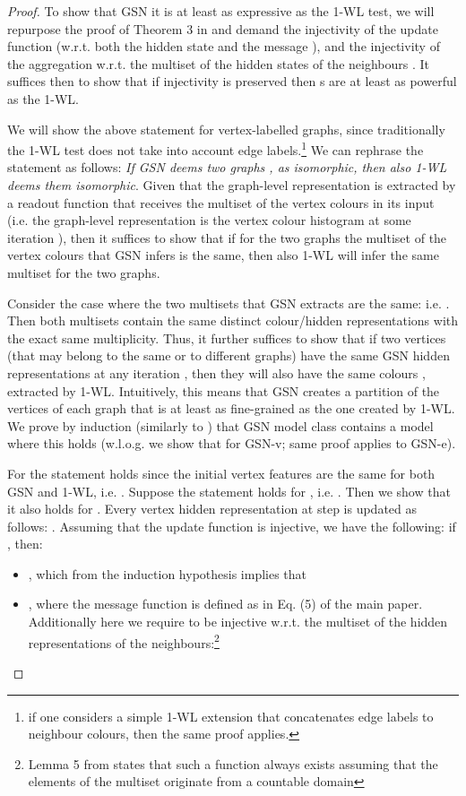 \begin{proof}

To show that GSN it is at least as expressive as the 1-WL test, we will repurpose the proof of Theorem 3 in \cite{xu2018how}  and demand the injectivity of the update function (w.r.t. both the hidden state  and the message ), and the injectivity of the aggregation w.r.t. the multiset of the hidden states of the neighbours . It suffices then to show that if injectivity is preserved then \modelname s are at least as powerful as the 1-WL.



We will show the above statement for vertex-labelled graphs, since traditionally the 1-WL test does not take into account edge labels.\footnote{if one considers a simple 1-WL extension that concatenates edge labels to neighbour colours, then the same proof applies.} We can rephrase the statement as follows: \textit{If GSN deems two graphs ,  as isomorphic, then also 1-WL deems them isomorphic}. Given that the graph-level representation is extracted by a readout function that receives the multiset of the vertex colours in its input (i.e. the graph-level representation is the vertex colour histogram at some iteration ), then it suffices to show that if for the two graphs the multiset of the vertex colours that GSN infers is the same, then also 1-WL will infer the same multiset for the two graphs. 

Consider the case where the two multisets that GSN extracts are the same:  i.e. . Then both multisets contain the same distinct colour/hidden representations with the exact same multiplicity. Thus, it further suffices to show that
if two vertices  (that may belong to the same or to different graphs) have the same GSN hidden representations  at any iteration , then they will also have the same colours , extracted by 1-WL. Intuitively, this means that GSN creates a partition of the vertices of each graph that is at least as fine-grained as the one created by 1-WL. We prove by induction (similarly to \cite{xu2018how}) that GSN model class contains a model where this holds (w.l.o.g. we show that for GSN-v; same proof applies to GSN-e).

For  the statement holds since the initial vertex features are the same for both GSN and 1-WL, i.e. . Suppose the statement holds for , i.e. . Then we show that it also holds for . Every vertex hidden representation at step  is updated as follows: . Assuming that the update function  is injective, we have the following: if , then:
\begin{itemize}[wide, labelwidth=!, labelindent=0pt]
\item , which from the induction hypothesis implies that  
\item , where the message function is defined as in Eq. (5) of the main paper.
Additionally here we require  to be injective w.r.t. the multiset of the hidden representations of the neighbours:\footnote{Lemma 5 from \cite{xu2018how} states that such a function always exists assuming that the elements of the multiset originate from a countable domain}




\end{itemize}
\end{proof}
